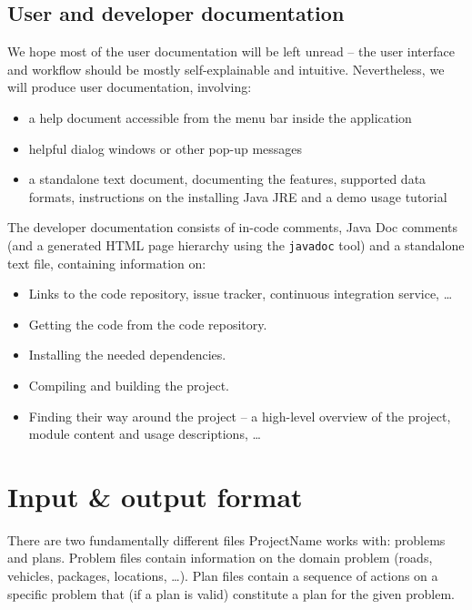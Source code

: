 \documentclass[10pt,a4paper,oneside]{article}
\newcommand{\pname}{ProjectName} %
\begin{document}
\subsection{User and developer documentation} \label{docs}

We hope most of the user documentation will be left unread -- the user interface and workflow should be
mostly self-explainable and intuitive.
Nevertheless, we will produce user documentation, involving:
\begin{itemize}
\item a help document accessible from the menu bar inside the application
\item helpful dialog windows or other pop-up messages
\item a standalone text document, documenting the features, supported data formats, instructions on the installing Java JRE and a demo usage tutorial
\end{itemize}

The developer documentation consists of in-code comments, Java Doc comments (and a generated HTML page hierarchy using the \verb+javadoc+ tool) and a standalone text file, containing information on:
\begin{itemize}
\item Links to the code repository, issue tracker, continuous integration service, \ldots
\item Getting the code from the code repository.
\item Installing the needed dependencies.
\item Compiling and building the project.
\item Finding their way around the project -- a high-level overview of the project, module content and usage descriptions, \ldots
\end{itemize}






\section{Input \& output format} \label{input-output}

There are two fundamentally different files \pname{} works with: problems and plans.
Problem files contain information on the domain problem (roads, vehicles, packages, locations, \ldots).
Plan files contain a sequence of actions on a specific problem that (if a plan is valid) constitute a plan
for the given problem.
\end{document}

